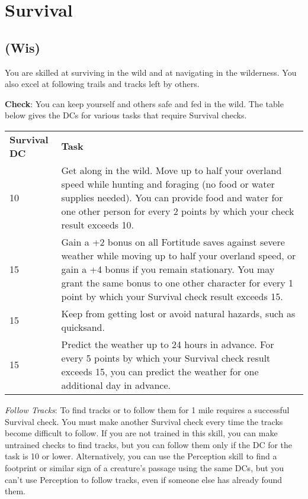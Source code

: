 \section{Survival}

\label{f0}
\subsection{(Wis)}

				
You are skilled at surviving in the wild and at navigating in the wilderness. You also excel at following trails and tracks left by others.
				
\textbf{Check}: You can keep yourself and others safe and fed in the wild. The table below gives the DCs for various tasks that require Survival checks.
\begin{table}
 \begin{tabular}{ll}

\textbf{Survival DC} & \textbf{Task}\\
10 & Get along in the wild. Move up to half your overland speed while hunting and foraging (no food or water supplies needed). You can provide food and water for one other person for every 2 points by which your check result exceeds 10.\\
15 & Gain a +2 bonus on all Fortitude saves against severe weather while moving up to half your overland speed, or gain a +4 bonus if you remain stationary. You may grant the same bonus to one other character for every 1 point by which your Survival check result exceeds 15.\\
15 & Keep from getting lost or avoid natural hazards, such as quicksand.\\
15 & Predict the weather up to 24 hours in advance. For every 5 points by which your Survival check result exceeds 15, you can predict the weather for one additional day in advance.\\
 \end{tabular}

\end{table}

				
\textit{Follow Tracks}: To find tracks or to follow them for 1 mile requires a successful Survival check. You must make another Survival check every time the tracks become difficult to follow. If you are not trained in this skill, you can make untrained checks to find tracks, but you can follow them only if the DC for the task is 10 or lower. Alternatively, you can use the Perception skill to find a footprint or similar sign of a creature's passage using the same DCs, but you can't use Perception to follow tracks, even if someone else has already found them.
				
